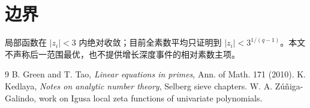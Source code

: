 \documentclass[11pt,a4paper]{ctexart}
\begin{document}
\section{边界}
局部函数在 \(|z_i|<3\) 内绝对收敛；目前全素数平均只证明到 \(|z_i|<3^{1/(q-1)}\)。本文不声称后一范围最优，也不提供增长深度事件的相对素数主项。

\begin{thebibliography}{9}
 B. Green and T. Tao, \emph{Linear equations in primes}, Ann. of Math. 171 (2010).
 K. Kedlaya, \emph{Notes on analytic number theory}, Selberg sieve chapters.
 W. A. Zúñiga-Galindo, work on Igusa local zeta functions of univariate polynomials.
\end{thebibliography}
\end{document}
